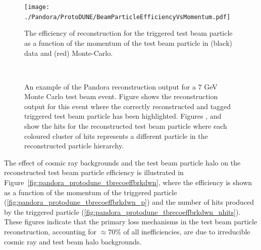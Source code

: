 \begin{figure}[!ht]
\centering
\texttt{[image: ./Pandora/ProtoDUNE/BeamParticleEfficiencyVsMomentum.pdf]}
\caption[Reconstruction efficiency for triggered test beam particle per particle momentum  and .]{The efficiency of reconstruction for the triggered test beam particle as a function of the momentum of the test beam particle in (black) data and (red) Monte-Carlo.}
\label{pandora_protodune_tbrecoeff}
\end{figure}

\begin{figure}[!ht]
\centering
{} \\ 
\caption[Pandora reconstruction output for \SI{7}{GeV}  test beam event]{An example of the Pandora reconstruction output for a 7 GeV Monte Carlo test beam event.  Figure \protect{} shows the \threed reconstruction output for this event where the correctly reconstructed and tagged triggered test beam particle has been highlighted.  Figures \protect{}, \protect{} and \protect{} show the \twod hits for the reconstructed test beam particle where each coloured cluster of hits represents a different particle in the reconstructed particle hierarchy.}
\label{pandora_protodune_reco}
\end{figure}

The effect of cosmic ray backgrounds and the test beam particle halo on the reconstructed test beam particle efficiency is illustrated in Figure~\ref{fig:pandora_protodune_tbrecoeffbrkdwn}, where the efficiency is shown as a function of the momentum of the triggered particle (\ref{fig:pandora_protodune_tbrecoeffbrkdwn_p}) and the number of hits produced by the triggered particle (\ref{fig:pandora_protodune_tbrecoeffbrkdwn_nhits}).  These figures indicate that the primary loss mechanisms in the test beam particle reconstruction, accounting for $\approx 70\%$ of all inefficiencies, are due to irreducible cosmic ray and test beam halo backgrounds.

